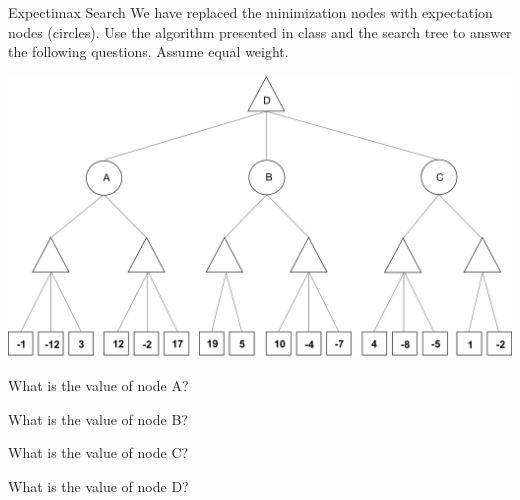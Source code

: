 \begin{problem}{Expectimax Search}
We have replaced the minimization nodes with expectation nodes (circles). Use the algorithm presented in class and the search tree to answer the following questions. Assume equal weight.

\begin{center}
\includegraphics[width=400 pt]{figures/Expectimax-q5.png}
\end{center}

\begin{question}[2]
What is the value of node A?

\end{question}

\begin{question}[2]
What is the value of node B?

\end{question}

\begin{question}[2]
What is the value of node C?

\end{question}

\begin{question}[2]
What is the value of node D?

\end{question}

\end{problem}